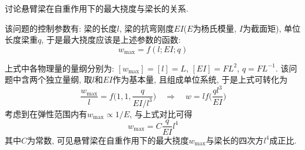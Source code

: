 \begin{problem}[18]
讨论悬臂梁在自重作用下的最大挠度与梁长的关系.
\end{problem}
\begin{solution}
\begin{minipage}[c]{0.7\linewidth}
该问题的控制参数有: 梁的长度$l$, 梁的抗弯刚度$EI$($E$为杨氏模量, $I$为截面矩), 单位长度梁重$q$, 于是最大挠度应该是上述参数的函数:
\[
w_{\max} = f(l; EI; q)
\]
\end{minipage}
\begin{minipage}[c]{0.3\linewidth}
\begin{center}

\end{center}
\end{minipage}\vspace{10pt}

上式中各物理量的量纲分别为: $[w_{\max}]=[l]=L$, $[EI]=FL^2$, $q=FL^{-1}$. 该问题中含两个独立量纲, 取$l$和$EI$作为基本量, 且组成单位系统, 于是上式可转化为
\[
\frac{w_{\max}}{l} = f\bigg(1,1,\frac{q}{EI/l^3}\bigg) 
\quad\Longrightarrow\quad
w = l f\bigg(\frac{ql^3}{EI}\bigg) 
\]
考虑到在弹性范围内有$w_{\max}\propto 1/E$, 与上式对比可得
\[
w_{\max} = C\frac{q}{EI} l^4
\]
其中$C$为常数, 可见悬臂梁在自重作用下的最大挠度$w_{\max}$与梁长的四次方$l^4$成正比.
\end{solution}
